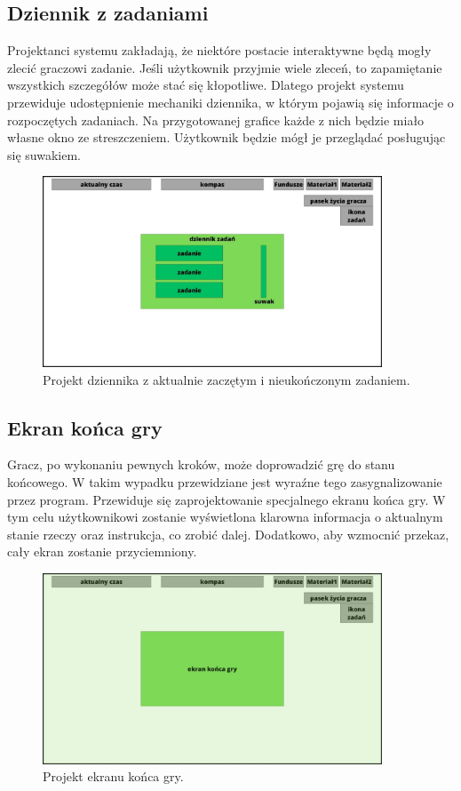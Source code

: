 \subsection{Dziennik z zadaniami}
Projektanci systemu zakładają, że niektóre postacie interaktywne będą mogły zlecić graczowi zadanie. Jeśli użytkownik przyjmie wiele zleceń,
to zapamiętanie wszystkich szczegółów może stać się kłopotliwe. Dlatego projekt systemu przewiduje udostępnienie mechaniki dziennika, w którym 
pojawią się informacje o rozpoczętych zadaniach. Na przygotowanej grafice każde z nich będzie miało własne okno ze streszczeniem. Użytkownik 
będzie mógł je przeglądać posługując się suwakiem.
\begin{figure}[htbp]
    \centering
    \includegraphics[width=0.9\textwidth]{images/ui/ui_proj_dziennik_zadan.jpg}
    \caption{Projekt dziennika z aktualnie zaczętym i nieukończonym zadaniem.}\label{fig:end_sc}
\end{figure}

\subsection{Ekran końca gry}
Gracz, po wykonaniu pewnych kroków, może doprowadzić grę do stanu końcowego. W takim wypadku przewidziane jest wyraźne tego zasygnalizowanie przez program.
Przewiduje się zaprojektowanie specjalnego ekranu końca gry. W tym celu użytkownikowi zostanie wyświetlona klarowna informacja o aktualnym stanie rzeczy oraz instrukcja,
co zrobić dalej. Dodatkowo, aby wzmocnić przekaz, cały ekran zostanie przyciemniony.
\begin{figure}[htbp]
    \centering
    \includegraphics[width=0.9\textwidth]{images/ui/ui_prooj_koniec_gry.jpg}
    \caption{Projekt ekranu końca gry.}\label{fig:end_sc}
\end{figure}
